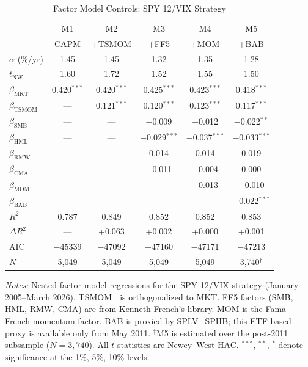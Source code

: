 \begin{table}[H]
\centering
\begin{threeparttable}
\caption{Factor Model Controls: SPY 12/VIX Strategy}
\label{tab:ff5}
\small
\begin{tabular}{@{}lccccc@{}}
\toprule
& M1 & M2 & M3 & M4 & M5 \\
& CAPM & +TSMOM & +FF5 & +MOM & +BAB \\
\midrule
$\alpha$ (\%/yr) & 1.45 & 1.45 & 1.32 & 1.35 & 1.28 \\
$t_{\text{NW}}$  & 1.60 & 1.72 & 1.52 & 1.55 & 1.50 \\
\midrule
$\beta_{\text{MKT}}$ & 0.420$^{***}$ & 0.420$^{***}$ & 0.425$^{***}$ & 0.423$^{***}$ & 0.418$^{***}$ \\
$\beta_{\text{TSMOM}}^{\perp}$ & --- & 0.121$^{***}$ & 0.120$^{***}$ & 0.123$^{***}$ & 0.117$^{***}$ \\
$\beta_{\text{SMB}}$ & --- & --- & $-$0.009 & $-$0.012 & $-$0.022$^{**}$ \\
$\beta_{\text{HML}}$ & --- & --- & $-$0.029$^{***}$ & $-$0.037$^{***}$ & $-$0.033$^{***}$ \\
$\beta_{\text{RMW}}$ & --- & --- & 0.014 & 0.014 & 0.019 \\
$\beta_{\text{CMA}}$ & --- & --- & $-$0.011 & $-$0.004 & 0.000 \\
$\beta_{\text{MOM}}$ & --- & --- & --- & $-$0.013 & $-$0.010 \\
$\beta_{\text{BAB}}$ & --- & --- & --- & --- & $-$0.022$^{***}$ \\
\midrule
$R^2$    & 0.787 & 0.849 & 0.852 & 0.852 & 0.853 \\
$\Delta R^2$ & --- & +0.063 & +0.002 & +0.000 & +0.001 \\
AIC     & $-$45339 & $-$47092 & $-$47160 & $-$47171 & $-$47213 \\
$N$     & 5,049 & 5,049 & 5,049 & 5,049 & 3,740$^{\dagger}$ \\
\bottomrule
\end{tabular}
\begin{tablenotes}
\small
\item \textit{Notes:} Nested factor model regressions for the SPY 12/VIX strategy (January 2005--March 2026). TSMOM$^{\perp}$ is orthogonalized to MKT. FF5 factors (SMB, HML, RMW, CMA) are from Kenneth French's library. MOM is the Fama--French momentum factor. BAB is proxied by SPLV$-$SPHB; this ETF-based proxy is available only from May 2011. $^{\dagger}$M5 is estimated over the post-2011 subsample ($N = 3{,}740$). All $t$-statistics are Newey--West HAC. $^{***}$, $^{**}$, $^{*}$ denote significance at the 1\%, 5\%, 10\% levels.
\end{tablenotes}
\end{threeparttable}
\end{table}


